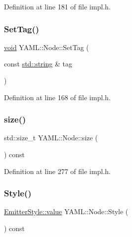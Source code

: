 Definition at line 181 of file impl.\+h.

\mbox{\label{class_y_a_m_l_1_1_node_a8c9b93527cb12dd9b5d464adcbd8c781}} 
\subsubsection{\texorpdfstring{SetTag()}{SetTag()}}
{\footnotesize\ttfamily \mbox{\hyperlink{glad_8h_a950fc91edb4504f62f1c577bf4727c29}{void}} Y\+A\+M\+L\+::\+Node\+::\+Set\+Tag (\begin{DoxyParamCaption}\item[{const \mbox{\hyperlink{glad_8h_ac83513893df92266f79a515488701770}{std\+::string}} \&}]{tag }\end{DoxyParamCaption})\hspace{0.3cm}{\ttfamily [inline]}}



Definition at line 168 of file impl.\+h.

\mbox{\label{class_y_a_m_l_1_1_node_ae843efe9fc5933f7adec123661c73c16}} 
\subsubsection{\texorpdfstring{size()}{size()}}
{\footnotesize\ttfamily std\+::size\+\_\+t Y\+A\+M\+L\+::\+Node\+::size (\begin{DoxyParamCaption}{ }\end{DoxyParamCaption}) const\hspace{0.3cm}{\ttfamily [inline]}}



Definition at line 277 of file impl.\+h.

\mbox{\label{class_y_a_m_l_1_1_node_ac1e18c6a11d984560dedbf4ca816d87e}} 
\subsubsection{\texorpdfstring{Style()}{Style()}}
{\footnotesize\ttfamily \mbox{\hyperlink{struct_y_a_m_l_1_1_emitter_style_ae86640662c85ce6062a37f9636b6959f}{Emitter\+Style\+::value}} Y\+A\+M\+L\+::\+Node\+::\+Style (\begin{DoxyParamCaption}{ }\end{DoxyParamCaption}) const\hspace{0.3cm}{\ttfamily [inline]}}



